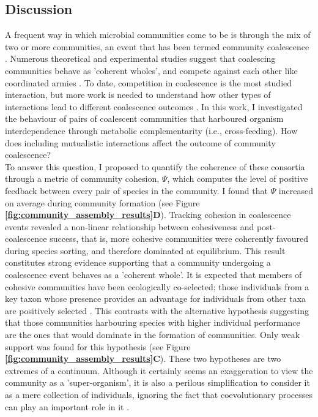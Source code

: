 \documentclass[titlepage,11pt]{article}
\begin{document}
\begin{linenumbers}
\begin{singlespace}
\section{Discussion}
	A frequent way in which microbial communities come to be is through the mix of two or more communities, an event that has been termed community coalescence  \citep{Rillig2015}. Numerous theoretical and experimental studies suggest that coalescing communities behave as 'coherent wholes', and compete against each other like coordinated armies \citep{Gilpin1994, Toquenaga1997, Livingston2013, Tikhonov2016, Tikhonov2017, Sierocinski2017, Lu2018}. To date, competition in coalescence is the most studied interaction, but more work is needed to understand how other types of interactions lead to different coalescence outcomes \citep{Castledine2020}. In this work, I investigated the behaviour of pairs of coalescent communities  that harboured organism interdependence through metabolic complementarity (i.e., cross-feeding). How does including mutualistic interactions affect the outcome of community coalescence?\\
	To answer this question, I proposed to quantify the coherence of these consortia through a metric of community cohesion, $ \Psi $, which computes the level of positive feedback between every pair of species in the community. I found that $ \Psi $ increased on average  during community formation (see Figure \textbf{\ref{fig:community_assembly_results}D}). Tracking cohesion in coalescence events revealed a non-linear relationship between cohesiveness and post-coalescence success, that is, more cohesive communities were coherently favoured during species sorting, and therefore dominated at equilibrium. This result constitutes strong evidence supporting that a community undergoing a coalescence event behaves as a 'coherent whole'. It is expected that members of cohesive communities have been ecologically co-selected; those individuals from a key taxon whose presence provides an advantage for individuals from other taxa are positively selected \citep{Sierocinski2017}. This contrasts with the alternative hypothesis suggesting that those communities harbouring species with higher individual performance are the ones that would dominate in the formation of communities. Only weak support was found for this hypothesis (see Figure \textbf{\ref{fig:community_assembly_results}C}). These two hypotheses are two extremes of a continuum. Although it certainly seems an exaggeration to view the community as a 'super-organism', it is also a perilous simplification to consider it as a mere collection of individuals, ignoring the fact that coevolutionary processes can play an important role in it \citep{Rillig2017}.\\

\end{singlespace}
\end{linenumbers}
\end{document}
